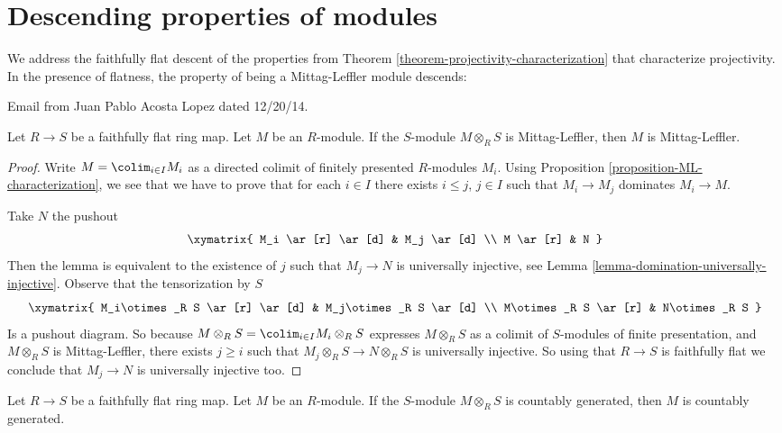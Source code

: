 \section{Descending properties of modules}
\label{section-descent}

\noindent
We address the faithfully flat descent of the properties from Theorem
\ref{theorem-projectivity-characterization} that characterize projectivity.
In the presence of flatness, the property of being a Mittag-Leffler module
descends:

\begin{lemma}
\label{lemma-ffdescent-ML}
\begin{reference}
Email from Juan Pablo Acosta Lopez dated 12/20/14.
\end{reference}
Let $R \to S$ be a faithfully flat ring map. Let $M$ be an $R$-module. If the
$S$-module $M \otimes_R S$ is Mittag-Leffler, then $M$ is Mittag-Leffler.
\end{lemma}

\begin{proof}
Write $M = \colim_{i\in I} M_i$ as a directed colimit
of finitely presented $R$-modules $M_i$.
Using Proposition \ref{proposition-ML-characterization}, we see that we
have to prove that for each $i \in I$ there exists $i \leq j$, $j\in I$
such that $M_i\rightarrow M_j$ dominates $M_i\rightarrow M$.

\medskip\noindent
Take $N$ the pushout
$$
\xymatrix{
M_i  \ar[r] \ar[d] & M_j \ar[d] \\
M \ar[r] & N
}
$$
Then the lemma is equivalent to the existence of $j$ such that
$M_j\rightarrow N$ is universally injective, see
Lemma \ref{lemma-domination-universally-injective}.
Observe that the tensorization by $S$
$$
\xymatrix{
M_i\otimes_R S  \ar[r] \ar[d] & M_j\otimes_R S \ar[d] \\
M\otimes_R S \ar[r] & N\otimes_R S
}
$$
Is a pushout diagram.  So because
$M \otimes_R S = \colim_{i\in I} M_i \otimes_R S$
expresses $M\otimes_R S$ as a colimit of $S$-modules of
finite presentation, and $M\otimes_R S$ is Mittag-Leffler,
there exists $j \geq i$ such that $M_j\otimes_R S\rightarrow N\otimes_R S$
is universally injective. So using that $R\rightarrow S$ is faithfully flat
we conclude that $M_j\rightarrow N$ is universally injective too.
\end{proof}

\begin{lemma}
\label{lemma-ffdescent-countable}
Let $R \to S$ be a faithfully flat ring map. Let $M$ be an $R$-module. If
the $S$-module $M \otimes_R S$ is countably generated, then $M$
is countably generated.
\end{lemma}

